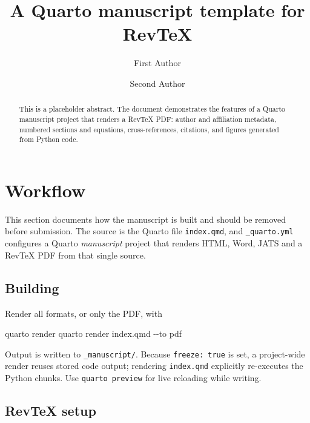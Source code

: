 \documentclass[
  aps,
  pra,
  reprint,
  superscriptaddress]{revtex4-2}
\newenvironment{Shaded}{\begin{snugshade}}{\end{snugshade}}
\newcommand{\AttributeTok}[1]{\textcolor[rgb]{0.40,0.45,0.13}{#1}}
\newcommand{\ExtensionTok}[1]{\textcolor[rgb]{0.00,0.23,0.31}{#1}}
\newcommand{\NormalTok}[1]{\textcolor[rgb]{0.00,0.23,0.31}{#1}}
\begin{document}
\title{A Quarto manuscript template for RevTeX}
\author{First Author}
\author{Second Author}
\begin{abstract}
This is a placeholder abstract. The document demonstrates the features
of a Quarto manuscript project that renders a RevTeX PDF: author and
affiliation metadata, numbered sections and equations, cross-references,
citations, and figures generated from Python code.
\end{abstract}
\maketitle


\section{Workflow}\label{sec-workflow}

This section documents how the manuscript is built and should be removed
before submission. The source is the Quarto file \texttt{index.qmd}, and
\texttt{\_quarto.yml} configures a Quarto \emph{manuscript} project that
renders HTML, Word, JATS and a RevTeX PDF from that single source.

\subsection{Building}\label{building}

Render all formats, or only the PDF, with

\begin{Shaded}
\begin{Highlighting}[]
\ExtensionTok{quarto}\NormalTok{ render}
\ExtensionTok{quarto}\NormalTok{ render index.qmd }\AttributeTok{{-}{-}to}\NormalTok{ pdf}
\end{Highlighting}
\end{Shaded}

Output is written to \texttt{\_manuscript/}. Because
\texttt{freeze:\ true} is set, a project-wide render reuses stored code
output; rendering \texttt{index.qmd} explicitly re-executes the Python
chunks. Use \texttt{quarto\ preview} for live reloading while writing.

\subsection{RevTeX setup}\label{revtex-setup}
\end{document}
